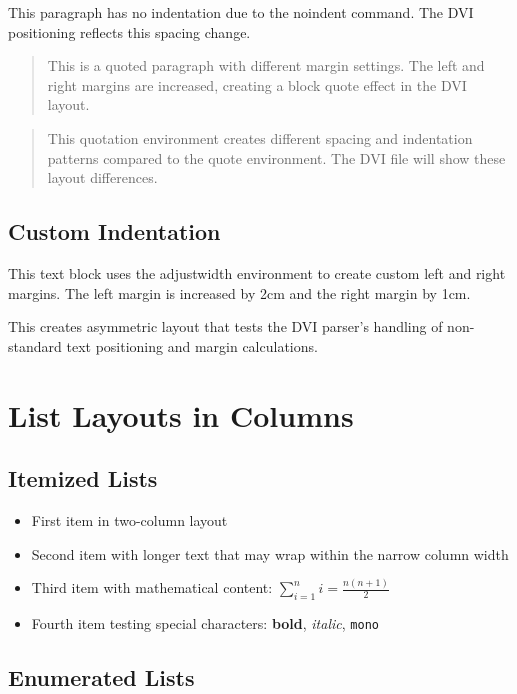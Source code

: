 \documentclass[10pt,twocolumn]{article}
\begin{document}
\noindent This paragraph has no indentation due to the noindent command. The DVI positioning reflects this spacing change.

\begin{quote}
This is a quoted paragraph with different margin settings. The left and right margins are increased, creating a block quote effect in the DVI layout.
\end{quote}

\begin{quotation}
This quotation environment creates different spacing and indentation patterns compared to the quote environment. The DVI file will show these layout differences.
\end{quotation}

\subsection{Custom Indentation}

\begin{adjustwidth}{2cm}{1cm}
This text block uses the adjustwidth environment to create custom left and right margins. The left margin is increased by 2cm and the right margin by 1cm.

This creates asymmetric layout that tests the DVI parser's handling of non-standard text positioning and margin calculations.
\end{adjustwidth}

\section{List Layouts in Columns}

\subsection{Itemized Lists}

\begin{itemize}
\item First item in two-column layout
\item Second item with longer text that may wrap within the narrow column width
\item Third item with mathematical content: $\sum_{i=1}^n i = \frac{n(n+1)}{2}$
\item Fourth item testing special characters: \textbf{bold}, \textit{italic}, \texttt{mono}
\end{itemize}

\subsection{Enumerated Lists}
\end{document}
